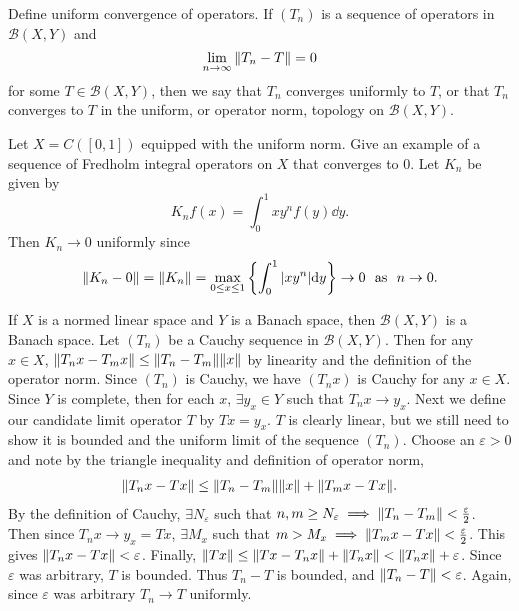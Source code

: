 \documentclass[avery5388,grid,frame]{flashcards}
\newcommand{\E}{\varepsilon}
\begin{document}
\begin{flashcard}
    {Define uniform convergence of operators.}
    If $(T_n)$ is a sequence of operators in $\mathcal{B}(X,Y)$ and
    $$\lim_{n\rightarrow \infty}\norm{T_n - T} = 0$$ for some $T \in \mathcal{B}(X,Y)$, then we say that $T_n$ converges uniformly to $T$, or that $T_n$ converges to $T$ in the uniform, or operator norm, topology on $\mathcal{B}(X,Y)$.
\end{flashcard}

\begin{flashcard}
    {Let $X = C([0,1])$ equipped with the uniform norm.  Give an example of a sequence of Fredholm integral operators on $X$ that converges to $0$.}
    Let $K_n$ be given by $$K_nf(x) = \int_0^1 xy^n f(y) \dd y.$$  Then $K_n \rightarrow 0$ uniformly since
    \begin{align*}
        \norm{K_n - 0} = \norm{K_n} = \max_{0\leq x \leq 1}\left\{\int_0^1 \abs{xy^n}\dd y\right\} \rightarrow 0 \ \ \text{as}\ \ n \rightarrow 0.
    \end{align*}
\end{flashcard}

\begin{flashcard}
    {If $X$ is a normed linear space and $Y$ is a Banach space, then $\mathcal{B}(X,Y)$ is a Banach space.}
    Let $(T_n)$ be a Cauchy sequence in $\mathcal{B}(X,Y)$.  Then for any $x \in X$, $\norm{T_nx - T_mx} \leq \norm{T_n - T_m}\norm{x}$ by linearity and the definition of the operator norm.  Since $(T_n)$ is Cauchy, we have $(T_nx)$ is Cauchy for any $x \in X$.  Since $Y$ is complete, then for each $x$, $\exists y_x \in Y$ such that $T_nx \rightarrow y_x$.  Next we define our candidate limit operator $T$ by $Tx = y_x$.  $T$ is clearly linear, but we still need to show it is bounded and the uniform limit of the sequence $(T_n)$.  Choose an $\E > 0$ and note by the triangle inequality and definition of operator norm,
    \begin{align*}
        \norm{T_nx - Tx} \leq \norm{T_n - T_m}\norm{x} + \norm{T_mx - Tx}.
    \end{align*}
    By the definition of Cauchy, $\exists N_\E$ such that $n,m \geq N_\E \implies \norm{T_n - T_m} < \frac{\E}{2}$.  Then since $T_nx \rightarrow y_x = Tx$, $\exists M_x$ such that $m > M_x \implies \norm{T_mx - Tx} < \frac{\E}{2}$.  This gives $\norm{T_n x - Tx} < \E$.  Finally, $\norm{Tx} \leq \norm{Tx - T_nx} + \norm{T_nx} < \norm{T_n x} + \E$.  Since $\E$ was arbitrary, $T$ is bounded.  Thus $T_n - T$ is bounded, and $\norm{T_n - T} < \E$.  Again, since $\E$ was arbitrary $T_n \rightarrow T$ uniformly.
\end{flashcard}
\end{document}
